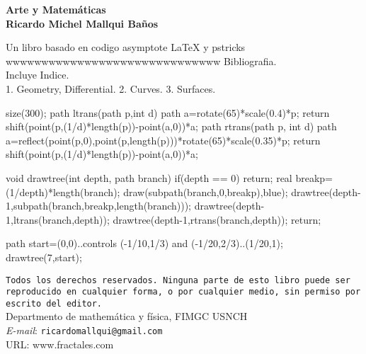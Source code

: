 \documentclass[a4paper]{book}
\begin{document}
 {
 	\thispagestyle{empty}
 	\noindent\bf{Arte y Matemáticas}\\
 	\bf{Ricardo Michel Mallqui Baños}\\
 	\vspace{3cm}

\noindent Un libro basado en codigo asymptote LaTeX y pstricks\\
wwwwwwwwwwwwwwwwwwwwwwwwwwwwww
\noindent Bibliografia.\\
\noindent Incluye Indice.\\
1. Geometry, Differential. 2. Curves. 3. Surfaces. \\
 	\vfill
 	\noindent
 		\begin{asy}
 	size(300);
 	path ltrans(path p,int d)
 	{
 	path a=rotate(65)*scale(0.4)*p;
 	return shift(point(p,(1/d)*length(p))-point(a,0))*a;
 	}
 	path rtrans(path p, int d)
 	{
 	path a=reflect(point(p,0),point(p,length(p)))*rotate(65)*scale(0.35)*p;
 	return shift(point(p,(1/d)*length(p))-point(a,0))*a;
 	}

 	void drawtree(int depth, path branch)
 	{
 	if(depth == 0) return;
 	real breakp=(1/depth)*length(branch);
 	draw(subpath(branch,0,breakp),blue);
 	drawtree(depth-1,subpath(branch,breakp,length(branch)));
 	drawtree(depth-1,ltrans(branch,depth));
 	drawtree(depth-1,rtrans(branch,depth));
 	return;
 	}

 	path start=(0,0)..controls (-1/10,1/3) and (-1/20,2/3)..(1/20,1);
 	drawtree(7,start);
 	\end{asy}

\noindent %
\texttt{Todos los derechos reservados. Ninguna parte de esto
libro puede ser reproducido en cualquier forma,
o por cualquier medio, sin permiso
por escrito del editor.}\\
Departmento de mathemática y física, FIMGC USNCH\\
\emph{E-mail}: \texttt{ricardomallqui@gmail.com}\\
URL: \textsf{www.fractales.com}

 }
\newpage
\renewcommand\listfigurename{Índice general}
\setcounter{page}{1}
\tableofcontents
\renewcommand\listfigurename{Lista de figuras}
\listoffigures
\end{document}
